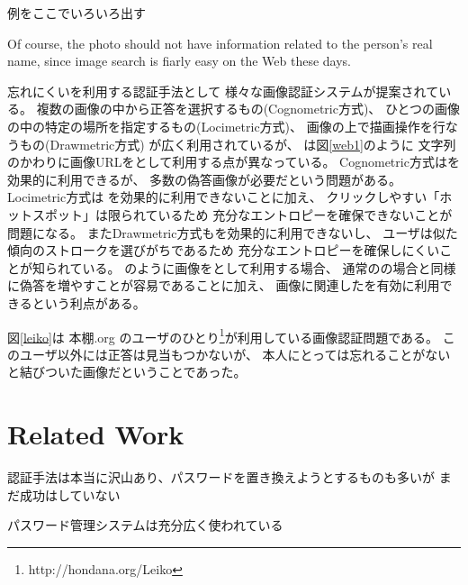\documentclass{article}
\begin{document}
例をここでいろいろ出す


Of course, the photo should not have information related to the
person's real name, since image search is fiarly easy on the Web these days.

忘れにくい{\EM}を利用する認証手法として
様々な画像認証システム\cite{Biddle:2012:GPL:2333112.2333114}\cite{GraphicalPasswords}\cite{小池英樹:2006-05-15}が提案されている。
複数の画像の中から正答を選択するもの(Cognometric方式)、
ひとつの画像の中の特定の場所を指定するもの(Locimetric方式)、
画像の上で描画操作を行なうもの(Drawmetric方式)
が広く利用されているが\cite{Biddle:2012:GPL:2333112.2333114}\cite{GraphicalPasswords}\cite{Guideline}、
{\EP}は図\ref{web1}のように
文字列のかわりに画像URLを{\SQ}として利用する点が異なっている。
%
Cognometric方式は{\EM}を効果的に利用できるが、
多数の偽答画像が必要だという問題がある。
Locimetric方式は
{\EM}を効果的に利用できないことに加え、
クリックしやすい「ホットスポット」は限られているため
充分なエントロピーを確保できないことが問題になる\cite{Dirik:2007:MUC:1280680.1280684}。
またDrawmetric方式も{\EM}を効果的に利用できないし、
ユーザは似た傾向のストロークを選びがちであるため
充分なエントロピーを確保しにくいことが知られている\cite{Nali}。
%
{\EP}のように画像を{\SQ}として利用する場合、
通常の{\SQ}の場合と同様に偽答を増やすことが容易であることに加え、
画像に関連した{\EM}を有効に利用できるという利点がある\cite{増井:CSS}。

図\ref{leiko}は
本棚.org\cite{hondana}\cite{hondanaorg}
のユーザのひとり\footnote{
  \textsf{http://hondana.org/Leiko}
}が利用している画像認証問題である。
このユーザ以外には正答は見当もつかないが、
本人にとっては忘れることがない{\EM}と結びついた画像だということであった。

% 
% 
% 
%

\section{Related Work}

認証手法は本当に沢山あり、パスワードを置き換えようとするものも多いが
まだ成功はしていない

パスワード管理システムは充分広く使われている

\cite{Stobert:2014:PMD:2683467.2683471} %
\end{document}
